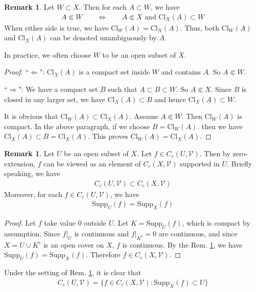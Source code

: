 \documentclass[12pt,b5paper,notitlepage]{article}
\theoremstyle{definition}
\newtheorem{rem}[df]{Remark}
\theoremstyle{plain}
\newcommand{\mc}{\mathcal}
\newcommand{\ovl}{\overline}
\newcommand{\Supp}{\mathrm{Supp}}
\newcommand{\Cl}{\mathrm{Cl}}
\numberwithin{equation}{section}
\begin{document}
\begin{rem}\label{lb1}
Let $W\subset X$. Then for each $A\subset W$, we have 
\begin{align*}
A\Subset W\qquad\Longleftrightarrow\qquad A\Subset X\text{ and }\Cl_X(A)\subset W
\end{align*}
When either side is true, we have $\Cl_W(A)=\Cl_X(A)$. Thus, both $\Cl_W(A)$ and $\Cl_X(A)$ can be denoted unambiguously by $\ovl A$.
\end{rem}

In practice, we often choose $W$ to be an open subset of $X$.

\begin{proof}
``$\Leftarrow$": $\Cl_X(A)$ is a compact set inside $W$ and contains $A$. So $A\Subset W$.

``$\Rightarrow$": We have a compact set $B$ such that $A\subset B\subset W$. So $A\Subset X$. Since $B$ is closed in any larger set, we have $\Cl_X(A)\subset B$ and hence $\Cl_X(A)\subset W$.

It is obvious that $\Cl_W(A)\subset\Cl_X(A)$. Assume $A\Subset W$. Then $\Cl_W(A)$ is compact. In the above paragraph, if we choose $B=\Cl_W(A)$. then we have $\Cl_X(A)\subset B=\Cl_X(A)$. This proves $\Cl_W(A)=\Cl_X(A)$.
\end{proof}

\begin{rem}\label{lb2}
Let $U$ be an open subset of $X$. Let $f\in C_c(U,\mc V)$. Then by zero-extension, $f$ can be viewed as an element of $C_c(X,\mc V)$ supported in $U$. Briefly speaking, we have
\begin{align*}
C_c(U,\mc V)\subset C_c(X,\mc V)
\end{align*}
Moreover, for each $f\in C_c(U,\mc V)$, we have
\begin{align*}
\Supp_U(f)=\Supp_X(f)
\end{align*}
\end{rem}

\begin{proof}
Let $f$ take value $0$ outside $U$. Let $K=\Supp_U(f)$, which is compact by assumption. Since $f|_U$ is continuous and $f|_{K^c}=0$ are continuous, and since $X=U\cup K^c$ is an open cover on $X$, $f$ is continuous. By the Rem. \ref{lb1}, we have $\Supp_U(f)=\Supp_X(f)$. Therefore $f\in C_c(X,\mc V)$.
\end{proof}


Under the setting of Rem. \ref{lb2}, it is clear that
\begin{align}
C_c(U,\mc V)=\{f\in C_c(X,\mc V):\Supp_X(f)\subset U\}
\end{align}
\end{document}

